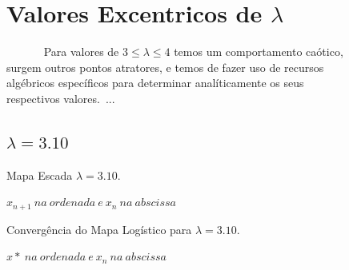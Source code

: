 \documentclass[pdftex,12pt,a4paper]{article}
\begin{document}
\begin{figure}

\section{Valores Excentricos de $\lambda$}
~~~~~~ Para valores de $3 \leq \lambda \leq 4$ temos um comportamento caótico, surgem outros pontos atratores, e temos de fazer uso de recursos algébricos específicos para determinar analíticamente os seus respectivos valores.\
...

\subsection{$\lambda = 3.10$}

\centering
\caption{Mapa Escada $\lambda = 3.10$.}
\caption*{$x_{n+1}\ na\ ordenada\ e\ x_{n}\ na\ abscissa$ }
\end{figure}

\begin{figure}
\centering
\caption{Convergência do Mapa Logístico para $\lambda = 3.10$.}
\caption*{$x*\ na\ ordenada\ e\ x_{n}\ na\ abscissa$ }
\end{figure}
\end{document}
